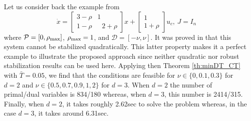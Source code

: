 \documentclass[12pt]{article}
\def\citep{\cite}
\def\rmax{\rho_{\textnormal{max}}}
\begin{document}
Let us consider back the example from \citep{Briat:15d}
%
\begin{equation}\label{eq:systex_stabz}
  \dot{x}=\begin{bmatrix}
    3-\rho & 1\\1-\rho &\ \ \ 2+\rho
  \end{bmatrix}x+\begin{bmatrix}
    1\\
    1+\rho
  \end{bmatrix}u_c,\ J=I_n
\end{equation}
where $\mathcal{P}=[0,\rho_{\textnormal{max}}]$, $\rho_{\textnormal{max}}=1$, and $\mathcal{D}=[-\nu,\nu]$. It was proved in \citep{Briat:15d} that this system cannot be stabilized quadratically. This latter property makes it a perfect example to illustrate the proposed approach since neither quadratic nor robust stabilization results can be used here. Applying then Theorem \ref{th:minDT_CT} with $\bar T=0.05$, we find that the conditions are feasible for $\nu\in\{0,0.1,0.3\}$ for $d=2$ and $\nu\in\{0.5,0.7,0.9,1,2\}$ for $d=3$. When $d=2$ the number of primal/dual variables is 834/180 whereas, when $d=3$, this number is 2414/315. Finally, when $d=2$, it takes roughly 2.62sec to solve the problem whereas, in the case $d=3$, it takes around 6.31sec. %
\end{document}
